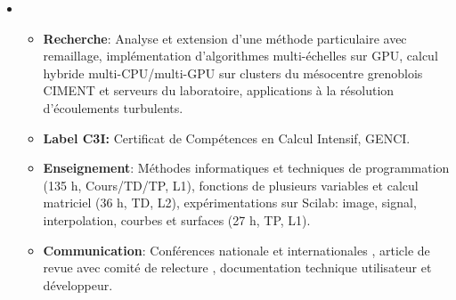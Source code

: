 \documentclass[]{cv}
\providecommand{\tightlist}{%
  \setlength{\itemsep}{0pt}\setlength{\parskip}{0pt}}
\begin{document}
\begin{itemize}
\item
  \begin{itemize}
  \tightlist
  \item
    \textbf{Recherche}: Analyse et extension d'une méthode particulaire
    avec remaillage, implémentation d'algorithmes multi-échelles sur
    GPU, calcul hybride multi-CPU/multi-GPU sur clusters du mésocentre
    grenoblois CIMENT et serveurs du laboratoire, applications à la
    résolution d'écoulements turbulents.
  \item
    \textbf{Label C3I:} Certificat de Compétences en Calcul Intensif,
    GENCI.
  \item
    \textbf{Enseignement}: Méthodes informatiques et techniques de
    programmation (135 h, Cours/TD/TP, L1), fonctions de plusieurs
    variables et calcul matriciel (36 h, TD, L2), expérimentations sur
    Scilab: image, signal, interpolation, courbes et surfaces (27 h, TP,
    L1).
  \item
    \textbf{Communication}: Conférences nationale
    \autocite{Etancelin2013b} et internationales
    \autocite{Etancelin2014a} \autocite{Balarac2014}, article de revue
    avec comité de relecture \autocite{Etancelin2014}, documentation
    technique utilisateur et développeur.
  \end{itemize}
\end{itemize}




\setlength{}
\renewcommand{\mkbibnamefirst}[1]{\normalfont{#1}}
\renewcommand{\mkbibnamelast}[1]{\normalfont{#1}}
\renewcommand{\mkbibnameprefix}[1]{\normalfont{#1}}
\renewcommand{\mkbibnameaffix}[1]{\normalfont{#1}}
\printbibliography{}
\end{document}
